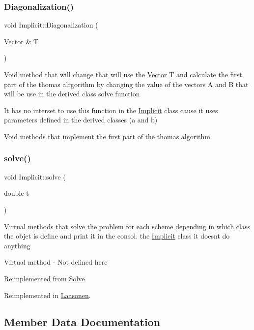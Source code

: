 \subsubsection{\texorpdfstring{Diagonalization()}{Diagonalization()}}
{\footnotesize\ttfamily void Implicit\+::\+Diagonalization (\begin{DoxyParamCaption}\item[{\hyperlink{class_vector}{Vector} \&}]{T }\end{DoxyParamCaption})}

Void method that will change that will use the \hyperlink{class_vector}{Vector} T and calculate the first part of the thomas alrgorithm by changing the value of the vectors A and B that will be use in the derived class solve function

It has no interset to use this function in the \hyperlink{class_implicit}{Implicit} class cause it uses parameters defined in the derived classes (a and b)

Void methods that implement the first part of the thomas algorithm \mbox{\label{class_implicit_a027adb4276376991f75fcffbd34740b3}} 
\subsubsection{\texorpdfstring{solve()}{solve()}}
{\footnotesize\ttfamily void Implicit\+::solve (\begin{DoxyParamCaption}\item[{double}]{t }\end{DoxyParamCaption})\hspace{0.3cm}{\ttfamily [virtual]}}

Virtual methods that solve the problem for each scheme depending in which class the objet is define and print it in the consol.  the \hyperlink{class_implicit}{Implicit} class it doesn\textquotesingle{}t do anything

Virtual method -\/ Not defined here 

Reimplemented from \hyperlink{class_solve_a1a56722993fdabea9928637d7dd8a2c7}{Solve}.



Reimplemented in \hyperlink{class_laasonen_aaa49ab7d15fbfef94a57a0e89977d1c6}{Laasonen}.



\subsection{Member Data Documentation}
\mbox{\label{class_implicit_a58a95622ffc58ae2f468d3ef4f0d215c}} 
